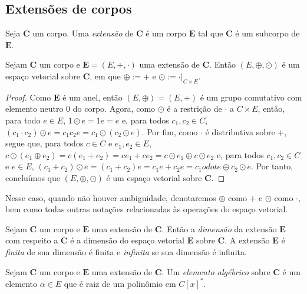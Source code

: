 \subsection{Extensões de corpos}

\begin{definition}
	Seja $\bm C$ um corpo. Uma \emph{extensão} de $\bm C$ é um corpo $\bm E$ tal que $\bm C$ é um subcorpo de $\bm E$.
\end{definition}

\begin{proposition}
	Sejam $\bm C$ um corpo e $\bm E = (E,+,\cdot)$ uma extensão de $\bm C$. Então $(E,\oplus,\odot)$ é um espaço vetorial sobre $\bm C$, em que $\oplus := +$ e $\odot := \cdot|_{C \times E}$.
\end{proposition}
\begin{proof}
	Como $\bm E$ é um anel, então $(E,\oplus)=(E,+)$ é um grupo comutativo com elemento neutro $0$ do corpo. Agora, como $\odot$ é a restrição de $\cdot$ a $C \times E$, então, para todo $e \in E$, $1 \odot e = 1e = e$ e, para todos $c_1,c_2 \in C$, $(c_1 \cdot c_2) \odot e = c_1c_2e = c_1 \odot (c_2 \odot e)$. Por fim, como $\cdot$ é distributiva sobre $+$, segue que, para todos $c \in C$ e $e_1,e_2 \in E$, $c \odot (e_1 \oplus e_2) = c(e_1+e_2) = ce_1+ce_2 = c \odot e_1 \oplus c \odot e_2$ e, para todos $c_1,c_2 \in C$ e $e \in E$, $(c_1+c_2) \odot e = (c_1+c_2)e = c_1e+c_2e = c_1 odot e \oplus c_2 \odot e$. Por tanto, concluímos que $(E,\oplus,\odot)$ é um espaço vetorial sobre $\bm C$.
\end{proof}

\begin{notation}
	Nesse caso, quando não houver ambiguidade, denotaremos $\oplus$ como $+$ e $\odot$ como $\cdot$, bem como todas outras notações relacionadas às operações do espaço vetorial.
\end{notation}

\begin{definition}
	Sejam $\bm C$ um corpo e $\bm E$ uma extensão de $\bm C$. Então a \emph{dimensão} da extensão $\bm E$ com respeito a $\bm C$ é a dimensão do espaço vetorial $\bm E$ sobre $\bm C$. A extensão $\bm E$ é \emph{finita} de sua dimensão é finita e \emph{infinita} se sua dimensão é infinita.
\end{definition}

\begin{definition}
	Sejam $\bm C$ um corpo e $\bm E$ uma extensão de $\bm C$. Um \emph{elemento algébrico} sobre $\bm C$ é um elemento $\alpha \in E$ que é raiz de um polinômio em $C[x]^*$.
\end{definition}


